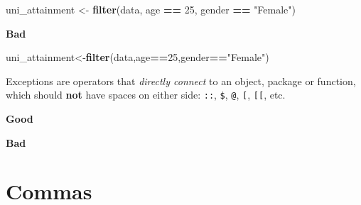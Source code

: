 \documentclass[]{book}
\newenvironment{Shaded}{\begin{snugshade}}{\end{snugshade}}
\newcommand{\DecValTok}[1]{\textcolor[rgb]{0.00,0.00,0.81}{#1}}
\newcommand{\KeywordTok}[1]{\textcolor[rgb]{0.13,0.29,0.53}{\textbf{#1}}}
\newcommand{\NormalTok}[1]{#1}
\newcommand{\OperatorTok}[1]{\textcolor[rgb]{0.81,0.36,0.00}{\textbf{#1}}}
\newcommand{\StringTok}[1]{\textcolor[rgb]{0.31,0.60,0.02}{#1}}
\begin{document}
\begin{Shaded}
\begin{Highlighting}[]
\NormalTok{uni_attainment <-}\StringTok{ }\KeywordTok{filter}\NormalTok{(data, age }\OperatorTok{==}\StringTok{ }\DecValTok{25}\NormalTok{, gender }\OperatorTok{==}\StringTok{ "Female"}\NormalTok{)}
\end{Highlighting}
\end{Shaded}

\textbf{Bad}

\begin{Shaded}
\begin{Highlighting}[]
\NormalTok{uni_attainment<-}\KeywordTok{filter}\NormalTok{(data,age}\OperatorTok{==}\DecValTok{25}\NormalTok{,gender}\OperatorTok{==}\StringTok{"Female"}\NormalTok{)}
\end{Highlighting}
\end{Shaded}

Exceptions are operators that \emph{directly connect} to an object, package or function, which should \textbf{not} have spaces on either side: \texttt{::}, \texttt{\$}, \texttt{@}, \texttt{{[}}, \texttt{{[}{[}}, etc.

\textbf{Good}

\begin{Shaded}
\end{Shaded}

\textbf{Bad}

\begin{Shaded}
\end{Shaded}

\hypertarget{commas}{%
\section{Commas}\label{commas}}
\end{document}
